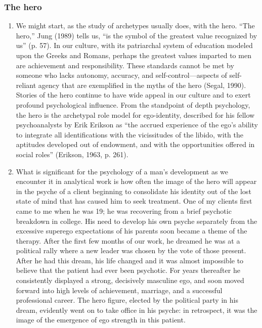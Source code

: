 \subsubsection{The hero}

\begin{enumerate}

    \item {} We might start, as the study of archetypes
        usually does, with the hero. “The hero,” Jung (1989) tells us, “is the
        symbol of the greatest value recognized by us” (p. 57). In our culture,
        with its patriarchal system of education modeled upon the Greeks and
        Romans, perhaps the greatest values imparted to men are achievement and
        responsibility. These standards cannot be met by someone who lacks
        autonomy, accuracy, and self-control—aspects of self-reliant agency
        that are exemplified in the myths of the hero (Segal, 1990). Stories of
        the hero continue to have wide appeal in our culture and to exert
        profound psychological influence. From the standpoint of depth
        psychology, the hero is the archetypal role model for ego-identity,
        described for his fellow psychoanalysts by Erik Erikson as “the accrued
        experience of the ego’s ability to integrate all identifications with
        the vicissitudes of the libido, with the aptitudes developed out of
        endowment, and with the opportunities offered in social roles”
        (Erikson, 1963, p. 261).

    \item {} What is significant for the
        psychology of a man’s development as we encounter it in analytical work
        is how often the image of the hero will appear in the psyche of a
        client beginning to consolidate his identity out of the lost state of
        mind that has caused him to seek treatment. One of my clients first
        came to me when he was 19; he was recovering from a brief psychotic
        breakdown in college. His need to develop his own psyche separately
        from the excessive superego expectations of his parents soon became a
        theme of the therapy. After the first few months of our work, he
        dreamed he was at a political rally where a new leader was chosen by
        the vote of those present. After he had this dream, his life changed
        and it was almost impossible to believe that the patient had ever been
        psychotic. For years thereafter he consistently displayed a strong,
        decisively masculine ego, and soon moved forward into high levels of
        achievement, marriage, and a successful professional career. The hero
        figure, elected by the political party in his dream, evidently went on
        to take office in his psyche: in retrospect, it was the image of the
        emergence of ego strength in this patient.


\end{enumerate}
